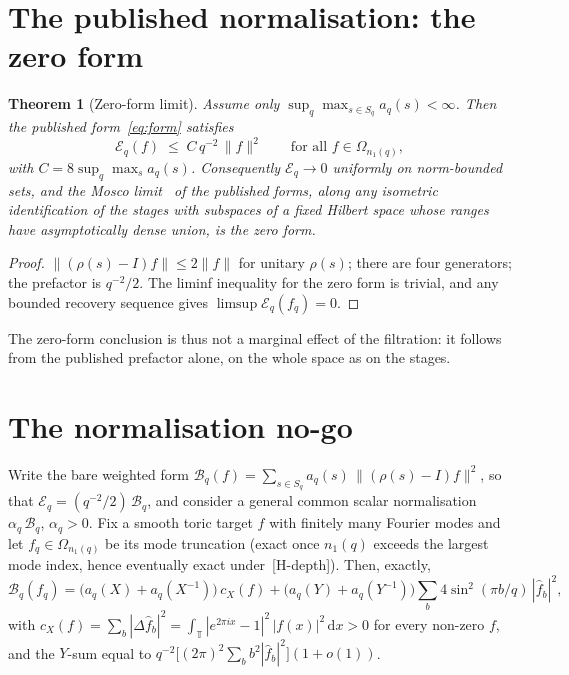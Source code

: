 \documentclass[11pt,a4paper]{article}
\theoremstyle{plain}
\newtheorem{theorem}{Theorem}[section]
\theoremstyle{definition}
\theoremstyle{remark}
\newcommand{\T}{\mathbb{T}}
\newcommand{\Eq}{\mathcal{E}_q}
\begin{document}
  \section{The published normalisation: the zero form}
  \label{sec:zero}

    \begin{theorem}[Zero-form limit]
      \label{thm:zero}
      Assume only $\sup_q \max_{s \in S_q} a_q(s) < \infty$.
      Then the published form~\eqref{eq:form} satisfies
      \[
        \Eq(f) \;\le\; C\, q^{-2}\, \|f\|^2 \qquad \text{for all } f \in \Omega_{n_1(q)},
      \]
      with $C = 8 \sup_q \max_s a_q(s)$.
      Consequently $\Eq \to 0$ uniformly on norm-bounded sets, and the Mosco
      limit~\cite{KuwaeShioya2003} of the published forms, along any isometric identification of the
      stages with subspaces of a fixed Hilbert space whose ranges have asymptotically dense union, is
      the zero form.
    \end{theorem}

    \begin{proof}
      $\|(\rho(s) - I) f\| \le 2\|f\|$ for unitary $\rho(s)$; there are four generators; the prefactor
      is $q^{-2}/2$.
      The liminf inequality for the zero form is trivial, and any bounded recovery sequence gives
      $\limsup \Eq(f_q) = 0$.
    \end{proof}

    The zero-form conclusion is thus not a marginal effect of the filtration: it follows from the
    published prefactor alone, on the whole space as on the stages.

  \section{The normalisation no-go}
  \label{sec:nogo}

    Write the bare weighted form
    $\mathcal{B}_q(f) = \sum_{s \in S_q} a_q(s)\, \|(\rho(s) - I) f\|^2$, so that
    $\Eq = (q^{-2}/2)\,\mathcal{B}_q$, and consider a general common scalar normalisation
    $\alpha_q\,\mathcal{B}_q$, $\alpha_q > 0$.
    Fix a smooth toric target $f$ with finitely many Fourier modes and let
    $f_q \in \Omega_{n_1(q)}$ be its mode truncation (exact once $n_1(q)$ exceeds the largest mode
    index, hence eventually exact under~[H-depth]).
    Then, exactly,
    \[
      \mathcal{B}_q(f_q)
      = \bigl(a_q(X) + a_q(X^{-1})\bigr)\, c_X(f)
      + \bigl(a_q(Y) + a_q(Y^{-1})\bigr) \sum_b 4 \sin^2(\pi b/q)\, |\hat f_b|^2 ,
    \]
    with $c_X(f) = \sum_b |\Delta \hat f_b|^2 = \int_\T |e^{2\pi i x} - 1|^2\, |f(x)|^2\,\mathrm{d}x
    > 0$ for every non-zero $f$, and the $Y$-sum equal to
    $q^{-2}\bigl[(2\pi)^2 \sum_b b^2 |\hat f_b|^2\bigr](1 + o(1))$.
\end{document}
